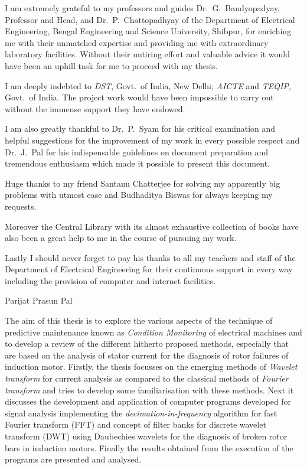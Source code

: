 \documentclass[a4paper,11pt]{report}
\begin{document}
\noindent I am extremely grateful to my professors and guides Dr.~G.~Bandyopadyay, Professor and Head, and Dr.~P.~Chattopadhyay of the Department of Electrical Engineering, Bengal Engineering and Science University, Shibpur, for enriching me with their unmatched expertise and providing me with extraordinary laboratory facilities. Without their untiring effort and valuable advice it would have been an uphill task for me to proceed with my thesis. 

I am deeply indebted to \emph{DST}, Govt.~of India, New Delhi; \emph{AICTE} and \emph{TEQIP}, Govt.~of India. The project work would have been impossible to carry out without the immense support they have endowed. 

I am also greatly thankful to Dr.~P.~Syam for his critical examination and helpful suggestions for the improvement of my work in every possible respect and Dr.~J.~Pal for his indispensable guidelines on document preparation and tremendous enthusiasm which made it possible to present this document.

Huge thanks to my friend Santanu Chatterjee for solving my apparently big problems with utmost ease and Budhaditya Biswas for always keeping my requests.

Moreover the Central Library with its almost exhaustive collection of books have also been a great help to me in the course of pursuing my work. 

Lastly I should never forget to pay his thanks to all my teachers and staff of the Department of Electrical Engineering for their continuous support in every way including the provision of computer and internet facilities.

\vspace{25mm}
\hspace*{100mm} Parijat Prasun Pal

\tableofcontents
\listoffigures
\listoftables

\abstract
The aim of this thesis is to explore the various aspects of the technique of predictive maintenance known as \emph{Condition Monitoring} of electrical machines and to develop a review of the different hitherto proposed methods, especially that are based on the analysis of stator current for the diagnosis of rotor failures of induction motor. Firstly, the thesis focusses on the emerging methods of \emph{Wavelet transform} for current analysis as compared to the classical methods of \emph{Fourier transform} and tries to develop some familiarisation with these methods. Next it discusses the development and application of computer programs developed for signal analysis implementing the \emph{decimation-in-frequency} algorithm for fast Fourier transform (FFT) and concept of filter banks for discrete wavelet transform (DWT) using Daubechies wavelets for the diagnosis of broken rotor bars in induction motors. Finally the results obtained from the execution of the programs are presented and analysed.
\end{document}

